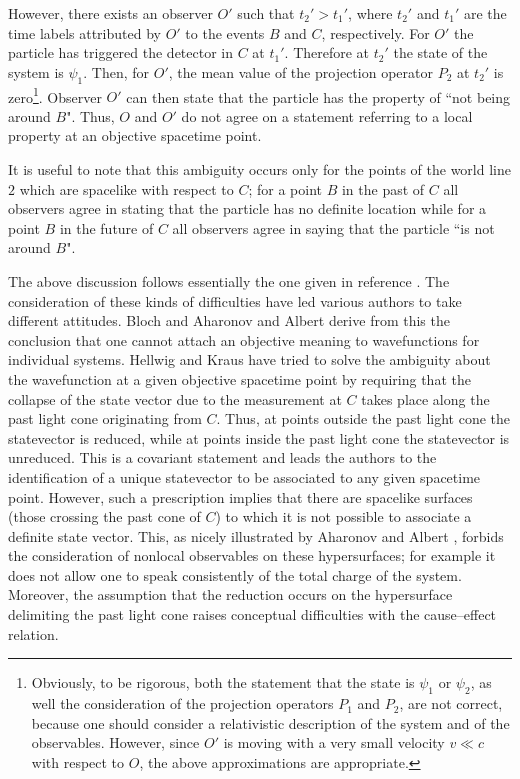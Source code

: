 \documentclass[10pt,a4paper]{article}
\begin{document}
However, there exists an observer $O'$ such that $t_{2}' >
t_{1}'$, where $t_{2}'$ and $t_{1}'$ are the time labels
attributed by $O'$ to the events $B$ and $C$, respectively. For
$O'$ the particle has triggered the detector in $C$ at $t_{1}'$.
Therefore at $t_{2}'$ the state of the system is $\psi_{1}$. Then,
for $O'$, the mean value of the projection operator $P_{2}$ at
$t_{2}'$ is zero\footnote{Obviously, to be rigorous, both the
statement that the state is $\psi_{1}$ or $\psi_{2}$, as well the
consideration of the projection operators $P_{1}$ and $P_{2}$, are
not correct, because one should consider a relativistic
description of the system and of the observables. However, since
$O'$ is moving with a very small velocity $v \ll c$ with respect
to $O$, the above approximations are appropriate.}. Observer $O'$
can then state that the particle has the property of ``not being
around $B$". Thus, $O$ and $O'$ do not agree on a statement
referring to a local property at an objective spacetime point.

It is useful to note that this ambiguity occurs only for the
points of the world line $2$ which are spacelike with respect to
$C$; for a point $B$ in the past of $C$ all observers agree in
stating that the particle has no definite location while for a
point $B$ in the future of $C$ all observers agree in saying that
the particle ``is not around $B$".

The above discussion follows essentially the one given in
reference \cite{bl1}. The consideration of these kinds of
difficulties have led various authors to take different attitudes.
Bloch \cite{bl1} and Aharonov and Albert \cite{aa1} derive from
this the conclusion that one cannot attach an objective meaning to
wavefunctions for individual systems. Hellwig and Kraus \cite{hkd}
have tried to solve the ambiguity about the wavefunction at a
given objective spacetime point by requiring that the collapse of
the state vector due to the measurement at $C$ takes place along the past
light cone originating from $C$. Thus, at points outside the past light
cone the statevector is reduced, while at points inside the past light
cone the statevector is unreduced. This is a covariant statement and leads
the authors to the identification of a unique statevector to be
associated to any given spacetime point. However, such a
prescription implies that there are spacelike surfaces (those
crossing the past cone of $C$) to which it is not possible to
associate a definite state vector. This, as nicely illustrated by
Aharonov and Albert \cite{aa1}, forbids the consideration of
nonlocal observables on these hypersurfaces; for example it does
not allow one to speak consistently of the total charge of the
system. Moreover, the assumption that the reduction occurs on the
hypersurface delimiting the past light cone raises conceptual
difficulties with the cause--effect relation.
\end{document}
